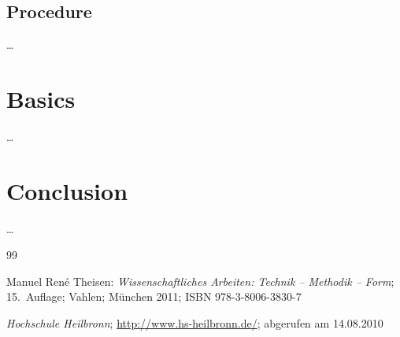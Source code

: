 \documentclass[12pt,toc=bib,toc=listof]{scrreprt}
\begin{document}

\section{Procedure} %
\label{sec:procedure}

\ldots


\chapter{Basics} %
\label{sec:basics}

\ldots



\chapter{Conclusion} %
\label{sec:conclusion}

\ldots


\appendix
\begin{thebibliography}{99}
\raggedright
 Manuel René Theisen:
 \emph{Wissenschaftliches Arbeiten: Technik -- Methodik -- Form};
 15.~Auflage; Vahlen; München 2011;
 ISBN 978-3-8006-3830-7

 \emph{Hochschule Heilbronn};
 \url{http://www.hs-heilbronn.de/};
 abgerufen am 14.08.2010
\end{thebibliography}
\end{document}
